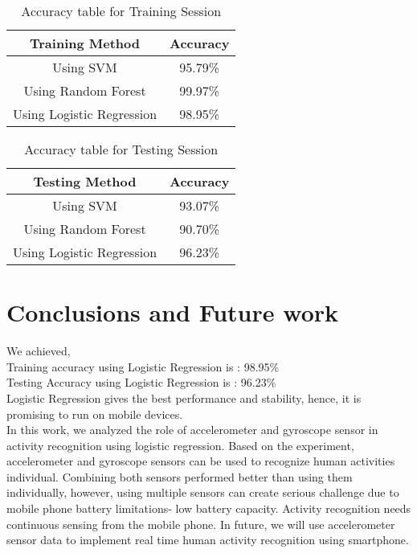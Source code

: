 \documentclass[12pt,a4paper]{report}
\begin{document}
\begin{table}[h!]
	\begin{center}
		\caption{Accuracy table for Training Session}
		\begin{tabular}{|c|c|} 
			\hline 
			\textbf{Training Method} & \textbf{Accuracy} \\
			\hline
			Using SVM  & 95.79\%\\
			\hline
			Using Random Forest  & 99.97\%\\
			\hline
			Using Logistic Regression   & 98.95\%\\
			\hline	
		\end{tabular}
	\end{center}
\end{table}
\begin{table}[h!]
	\begin{center}
		\caption{Accuracy table for Testing Session}
		\begin{tabular}{|c|c|} 
			\hline
			\textbf{Testing Method} & \textbf{Accuracy} \\
			\hline
			Using SVM & 93.07\%\\
			\hline
			Using Random Forest & 90.70\%\\
			\hline
			Using Logistic Regression & 96.23\%\\	
			\hline	
		\end{tabular}
	\end{center}
\end{table}

\newpage
   
\section{Conclusions and Future work}
	We achieved,\\ Training accuracy using Logistic Regression is : 98.95\%\\
	Testing Accuracy using Logistic Regression is : 96.23\%  \\
Logistic Regression gives the best performance and stability, hence, it is promising to run on mobile devices.\\
 In this work, we analyzed the role of accelerometer and gyroscope sensor in activity recognition using logistic regression. Based on the experiment, accelerometer and gyroscope sensors can be used to recognize human activities individual. Combining both sensors performed better than using them individually, however, using multiple sensors can create serious challenge due to mobile phone battery limitations- low battery capacity. Activity recognition needs continuous sensing from the mobile phone. In future, we will use accelerometer sensor data to implement real time human activity recognition using smartphone.  \cite{future}  
\end{document}
